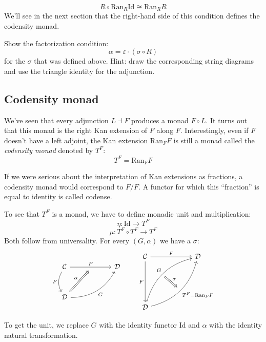 \documentclass[DaoFP]{subfiles}
\begin{document}
\[ R \circ \text{Ran}_R \text{Id} \cong \text{Ran}_R R \]
We'll see in the next section that the right-hand side of this condition defines the codensity monad.

\begin{exercise}
Show the factorization condition: 
\[ \alpha = \varepsilon \cdot (\sigma \circ R) \]
for the $\sigma$ that was defined above. Hint: draw the corresponding string diagrams and use the triangle identity for the adjunction.
\end{exercise}

 \subsection{Codensity monad}
 
 We've seen that every adjunction $L \dashv F$ produces a monad $F \circ L$. It turns out that this monad is the right Kan extension of $F$ along $F$. Interestingly, even if $F$ doesn't have a left adjoint, the Kan extension $\text{Ran}_F F$ is still a monad called the \emph{codensity monad} denoted by $T^F$:
 \[ T^F = \text{Ran}_F F \]
 
If we were serious about the interpretation of Kan extensions as fractions, a codensity monad would correspond to $F/F$. A functor for which this ``fraction'' is equal to identity is called codense.

To see that $T^F$ is a monad, we have to define monadic unit and multiplication:
\[ \eta \colon \text{Id} \to T^F \]
\[ \mu \colon T^F \circ T^F \to  T^F \]
 Both follow from universality. For every $(G, \alpha)$ we have a $\sigma$:
\[
 \begin{tikzcd} [row sep=1cm, column sep=1cm]
 \cat C
 \arrow[rr, "F", "" {name=ID, below} ]
 \arrow[d, bend right, "F"']
 && \cat D
 \\
 \cat D
  \arrow[urr, bend right, "G"']
 \arrow[Rightarrow, "\alpha",  to=ID]
 \end{tikzcd}
 \qquad
\begin{tikzcd}[row sep=2cm, column sep=2cm]
\cat C  \ar[d, "F"', "" {name=P}]
            \ar[r, "F", ""  {name=F, below, near start, bend right}]
&
\cat D
\\
\cat D
    \ar[ur, bend left, "G", "" {name=G, below}]
    \ar[ur, bend right, "T^F = \text{Ran}_F F"', "" {name=Ran}]
\arrow[Rightarrow, "\sigma", from=G, to=Ran]
\end{tikzcd}
\]

To get the unit, we replace $G$ with the identity functor $\text{Id}$ and $\alpha$ with the identity natural transformation. 
\end{document}
